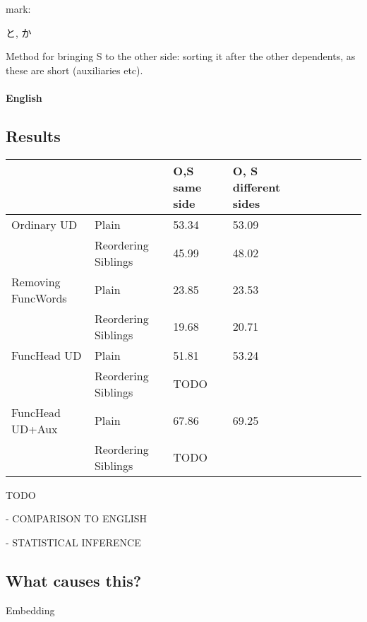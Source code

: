 \documentclass[11pt,a4paper]{article}
\begin{document}
mark: \begin{CJK}{UTF8}{min}と, か\end{CJK} 

Method for bringing S to the other side: sorting it after the other dependents, as these are short (auxiliaries etc).

\paragraph{English}

\subsection{Results}



\begin{center}
\begin{tabular}{lllllllll}
                    &                        & O,S same side   & O, S different sides    \\ \hline\hline
Ordinary UD         & Plain                  & 53.34 & 53.09\\
                    & Reordering Siblings    & 45.99 & 48.02 \\ \hline
Removing FuncWords  & Plain                  & 23.85 & 23.53 \\
                    & Reordering Siblings    & 19.68 & 20.71 \\ \hline
FuncHead UD         & Plain                  & 51.81 & 53.24 \\ %
                    & Reordering Siblings    &  TODO     &  \\ \hline
FuncHead UD+Aux         & Plain                  & 67.86 & 69.25 \\ %
                    & Reordering Siblings    &  TODO     & \\  \hline 
\end{tabular}
\end{center}

TODO

- COMPARISON TO ENGLISH

- STATISTICAL INFERENCE

\subsection{What causes this?} Embedding
\end{document}
